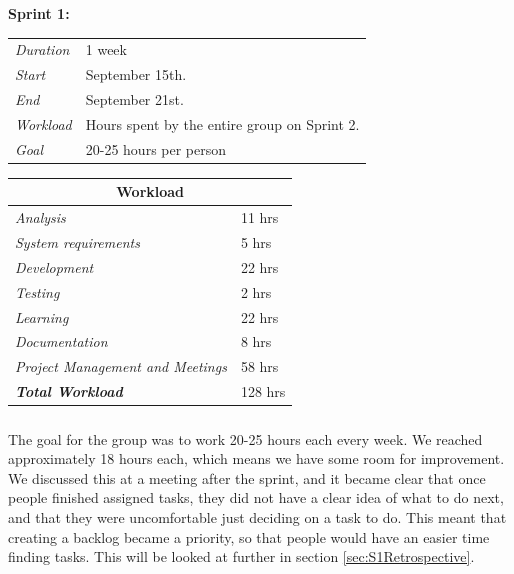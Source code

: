 \begin{minipage}{\linewidth}
\centering
\setlength{\tabcolsep}{22pt}
\textbf{Sprint 1:} 
\smallskip
{}
\begin{tabular}{ |l l| }
	\hline
	\it{Duration} & 1 week \\
	\it{Start} & September 15th. \\
	\it{End} & September 21st. \\
	\it{Workload} & Hours spent by the entire group on Sprint 2. \\
	\it{Goal} & 20-25 hours per person \\
	\hline
\end{tabular}
\end{minipage}
%
\bigskip
%
\begin{minipage}{\linewidth}
\setlength{\tabcolsep}{25pt}
\centering
{}
\begin{tabular}{ |l|l| }
	\hline
	\multicolumn{2}{|c|}{\cellcolor{gray!25} Workload} \\
	\hline
	\it{Analysis} & 11 hrs\\
	\it{System requirements} & 5 hrs\\
	\it{Development} & 22 hrs\\
	\it{Testing} & 2 hrs\\
	\it{Learning} & 22 hrs\\
	\it{Documentation} & 8 hrs\\
	\it{Project Management and Meetings} & 58 hrs\\
	\hline
	\textbf{\textit{Total Workload}} & 128 hrs\\
	\hline
\end{tabular}
\end{minipage}

\bigskip

\subparagraph{} 
The goal for the group was to work 20-25 hours each every week. We reached approximately 18 hours each, which means we have some room for improvement. We discussed this at a meeting after the sprint, and it became clear that once people finished assigned tasks, they did not have a clear idea of what to do next, and that they were uncomfortable just deciding on a task to do. This meant that creating a backlog became a priority, so that people would have an easier time finding tasks. This will be looked at further in section \ref{sec:S1Retrospective}.

